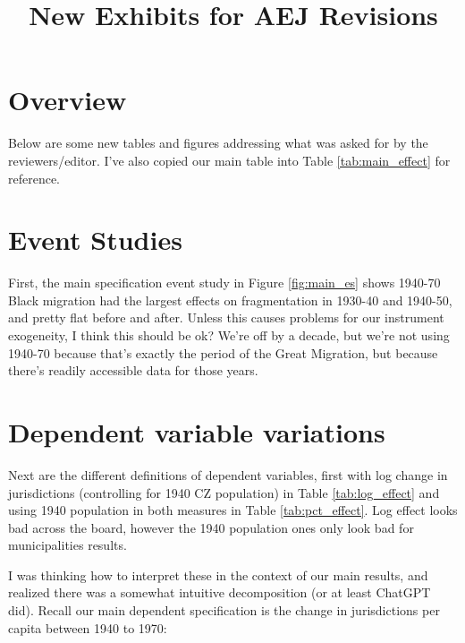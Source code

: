 \documentclass{article}
\title{New Exhibits for AEJ Revisions}
\begin{document}
\maketitle
\tableofcontents
{\footnotesize 
\listoffigures
\listoftables}
\clearpage

\section{Overview}

Below are some new tables and figures addressing what was asked for by the reviewers/editor. I've also copied our main table into Table \ref{tab:main_effect} for reference.

\section{Event Studies}
First, the main specification event study in Figure \ref{fig:main_es} shows 1940-70 Black migration had the largest effects on fragmentation in 1930-40 and 1940-50, and pretty flat before and after. Unless this causes problems for our instrument exogeneity, I think this should be ok? We're off by a decade, but we're not using 1940-70 because that's exactly the period of the Great Migration, but because there's readily accessible data for those years. 

\section{Dependent variable variations}

Next are the different definitions of dependent variables, first with log change in jurisdictions (controlling for 1940 CZ population) in Table \ref{tab:log_effect} and using 1940 population in both measures in Table \ref{tab:pct_effect}. Log effect looks bad across the board, however the 1940 population ones only look bad for municipalities results. 

I was thinking how to interpret these in the context of our main results, and realized there was a somewhat intuitive decomposition (or at least ChatGPT did). Recall our main dependent specification is the change in jurisdictions per capita between 1940 to 1970:
\end{document}
